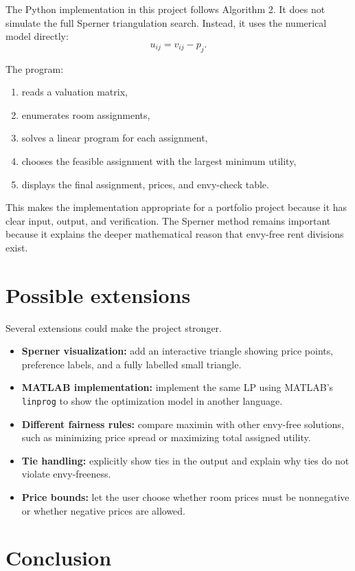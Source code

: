 \documentclass[11pt]{article}
\begin{document}
The Python implementation in this project follows Algorithm 2. It does not simulate the full Sperner triangulation search. Instead, it uses the numerical model directly:
\[
    u_{ij}=v_{ij}-p_j.
\]

The program:

\begin{enumerate}
    \item reads a valuation matrix,
    \item enumerates room assignments,
    \item solves a linear program for each assignment,
    \item chooses the feasible assignment with the largest minimum utility,
    \item displays the final assignment, prices, and envy-check table.
\end{enumerate}

This makes the implementation appropriate for a portfolio project because it has clear input, output, and verification. The Sperner method remains important because it explains the deeper mathematical reason that envy-free rent divisions exist.

\section{Possible extensions}

Several extensions could make the project stronger.

\begin{itemize}
    \item \textbf{Sperner visualization:} add an interactive triangle showing price points, preference labels, and a fully labelled small triangle.
    \item \textbf{MATLAB implementation:} implement the same LP using MATLAB's \texttt{linprog} to show the optimization model in another language.
    \item \textbf{Different fairness rules:} compare maximin with other envy-free solutions, such as minimizing price spread or maximizing total assigned utility.
    \item \textbf{Tie handling:} explicitly show ties in the output and explain why ties do not violate envy-freeness.
    \item \textbf{Price bounds:} let the user choose whether room prices must be nonnegative or whether negative prices are allowed.
\end{itemize}

\section{Conclusion}
\end{document}
